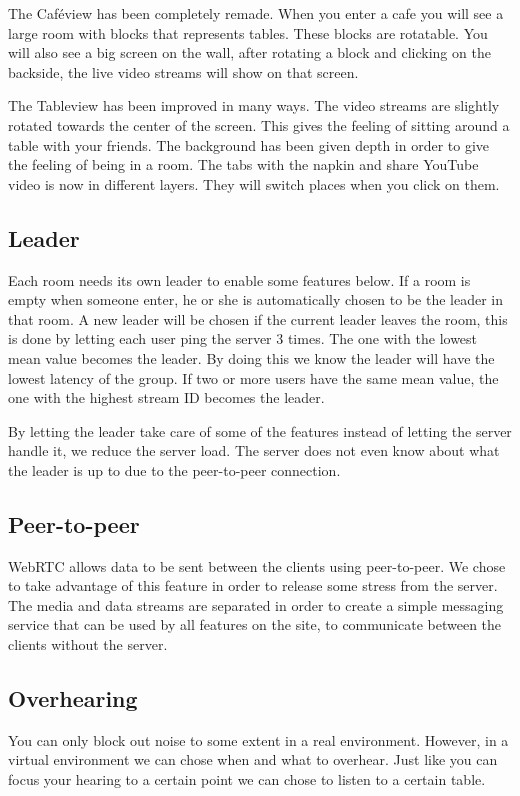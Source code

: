 \documentclass[12pt, titlepage]{article}
\begin{document}
The Caféview has been completely remade. When you enter a cafe you will see a large room with blocks that represents tables. These blocks are rotatable. You will also see a big screen on the wall, after rotating a block and clicking on the backside,  the live video streams will show on that screen.

The Tableview has been improved in many ways. The video streams are slightly rotated towards the center of the screen. This gives the feeling of sitting around a table with your friends. The background has been given depth in order to give the feeling of being in a room. The tabs with the napkin and share YouTube video is now in different layers. They will switch places when you click on them.
\subsection{Leader}
Each room needs its own leader to enable some features below. If a room is empty when someone enter, he or she is automatically chosen to be the leader in that room. A new leader will be chosen if the current leader leaves the room, this is done by letting each user ping the server 3 times. The one with the lowest mean value becomes the leader. By doing this we know the leader will have the lowest latency of the group. If two or more users have the same mean value, the one with the highest stream ID becomes the leader.

By letting the leader take care of some of the features instead of letting the server handle it, we reduce the server load. The server does not even know about what the leader is up to due to the peer-to-peer connection.
\subsection{Peer-to-peer}
WebRTC allows data to be sent between the clients using peer-to-peer. We chose to take advantage of this feature in order to release some stress from the server. The media and data streams are separated in order to create a simple messaging service that can be used by all features on the site, to communicate between the clients without the server.
\subsection{Overhearing}
You can only block out noise to some extent in a real environment. However, in a virtual environment we can chose when and what to overhear. Just like you can focus your hearing to a certain point we can chose to listen to a certain table.
\end{document}
